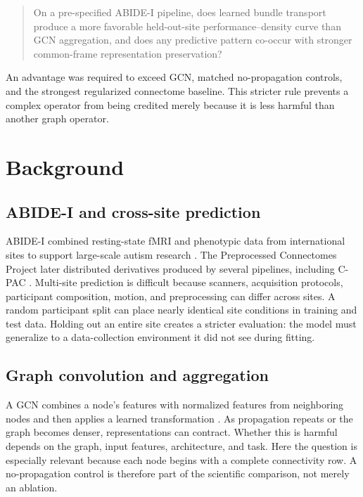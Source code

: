\documentclass[11pt,a4paper]{article}
\begin{document}
\begin{quote}
On a pre-specified ABIDE-I pipeline, does learned bundle transport produce a
more favorable held-out-site performance--density curve than GCN aggregation,
and does any predictive pattern co-occur with stronger common-frame
representation preservation?
\end{quote}

An advantage was required to exceed GCN, matched no-propagation controls, and
the strongest regularized connectome baseline. This stricter rule prevents a
complex operator from being credited merely because it is less harmful than
another graph operator.

\section{Background}

\subsection{ABIDE-I and cross-site prediction}

ABIDE-I combined resting-state fMRI and phenotypic data from international
sites to support large-scale autism research \cite{dimartino2014abide}. The
Preprocessed Connectomes Project later distributed derivatives produced by
several pipelines, including C-PAC \cite{abidepcp}. Multi-site prediction is
difficult because scanners, acquisition protocols, participant composition,
motion, and preprocessing can differ across sites. A random participant split
can place nearly identical site conditions in training and test data. Holding
out an entire site creates a stricter evaluation: the model must generalize to
a data-collection environment it did not see during fitting.

\subsection{Graph convolution and aggregation}

A GCN combines a node's features with normalized features from neighboring
nodes and then applies a learned transformation \cite{kipf2017gcn}. As
propagation repeats or the graph becomes denser, representations can contract.
Whether this is harmful depends on the graph, input features, architecture,
and task. Here the question is especially relevant because each node begins
with a complete connectivity row. A no-propagation control is therefore part
of the scientific comparison, not merely an ablation.
\end{document}

